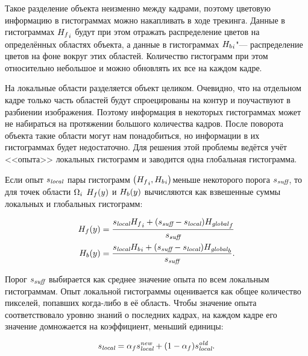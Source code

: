 Такое разделение объекта неизменно между кадрами, поэтому цветовую информацию
в гистограммах можно накапливать в ходе трекинга.
Данные в гистограммах ${H_f}_i$ будут при этом отражать распределение
цветов на определённых областях объекта, а данные в гистограммах ${H_b}_i$"--- распределение цветов на фоне вокруг этих областей.
Количество гистограмм при этом относительно небольшое и можно 
обновлять их все на каждом кадре.

На локальные области разделяется объект целиком. 
Очевидно, что на отдельном кадре только часть областей будут спроецированы на
контур и поучаствуют в разбиении изображения.
Поэтому информация в некоторых гистограммах может не набираться на протяжении
большого количества кадров.
После поворота объекта такие области могут нам понадобиться, но информации в
их гистограммах будет недостаточно.
Для решения этой проблемы ведётся учёт <<опыта>> локальных гистограмм и
заводится одна глобальная гистограмма.

Если опыт $s_{\text{\it local}}$ пары гистограмм $\left( {H_f}_i,
{H_b}_i \right)$меньше некоторого порога
$s_{\text{\it suff}}$, то для точек области $\Omega_i$ $H_f(y)$ и $H_b(y)$
вычисляются
как
взвешенные суммы локальных и глобальных гистограмм:

\begin{align}
\label{eqn:histo_skill}
H_f(y) &= \dfrac{s_{\text{\it local}} {H_f}_i + (s_{\text{\it suff}} -
s_{\text{\it local}})
        {H_{\text {\it global}}}_f}{s_{\text{\it suff}}} \\
H_b(y) &= \dfrac{s_{\text{\it local}} {H_b}_i + (s_{\text{\it suff}} -
s_{\text{\it local}})
        {H_{\text {\it global}}}_b}{s_{\text{\it suff}}}
\text{.}
\end{align}

Порог $s_{\text{\it suff}}$ выбирается как среднее значение опыта по всем
локальным
гистограммам.
Опыт локальной гистограммы оценивается как общее количество пикселей, попавших
когда-либо в её область.
Чтобы значение опыта соответствовало уровню знаний о последних кадрах, на
каждом кадре его значение домножается на коэффициент, меньший единицы:

\begin{equation}
s_{\text{\it local}} = \alpha_f s_{\text{\it local}}^{\text{\it new}} + (1 -
\alpha_f) s_{\text{\it local}}^{\text{\it old}}
\text{.}
\end{equation}


